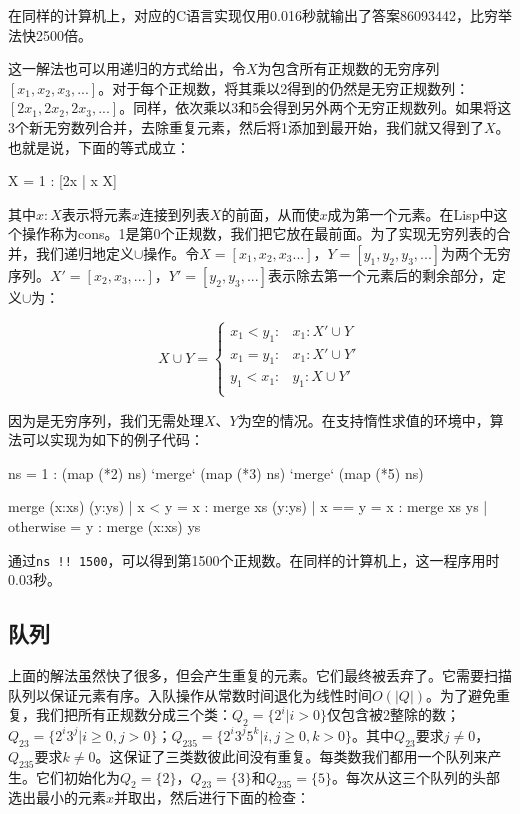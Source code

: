 \documentclass[b5paper]{ctexart}
\begin{document}
在同样的计算机上，对应的C语言实现仅用0.016秒就输出了答案86093442，比穷举法快2500倍。

这一解法也可以用递归的方式给出，令$X$为包含所有正规数的无穷序列$[x_1, x_2, x_3, ...]$。对于每个正规数，将其乘以2得到的仍然是无穷正规数列：$[2x_1, 2x_2, 2x_3, ...]$。同样，依次乘以3和5会得到另外两个无穷正规数列。如果将这3个新无穷数列合并，去除重复元素，然后将1添加到最开始，我们就又得到了$X$。也就是说，下面的等式成立：

\be
  X = 1 : [2x | \forall x \in X]\cup [3x | \forall x \in X] \cup [5x | \forall x \in X]
\ee

其中$x : X$表示将元素$x$连接到列表$X$的前面，从而使$x$成为第一个元素。在Lisp中这个操作称为cons。1是第0个正规数，我们把它放在最前面。为了实现无穷列表的合并，我们递归地定义$\cup$操作。令$X=[x_1, x_2, x_3...]$，$Y=[y_1, y_2, y_3, ...]$为两个无穷序列。$X' = [x_2, x_3, ...]$，$Y'=[y_2, y_3, ...]$表示除去第一个元素后的剩余部分，定义$\cup$为：

\[
X \cup Y = \begin{cases}
  x_1 < y_1: & x_1 : X' \cup Y \\
  x_1 = y_1: & x_1 : X' \cup Y' \\
  y_1 < x_1: & y_1 : X \cup Y' \\
\end{cases}
\]

因为是无穷序列，我们无需处理$X$、$Y$为空的情况。在支持惰性求值的环境中，算法可以实现为如下的例子代码：

\begin{Haskell}
ns = 1 : (map (*2) ns) `merge` (map (*3) ns) `merge` (map (*5) ns)

merge (x:xs) (y:ys) | x < y = x : merge xs (y:ys)
                    | x == y = x : merge xs ys
                    | otherwise = y : merge (x:xs) ys
\end{Haskell}

通过\texttt{ns !! 1500}，可以得到第1500个正规数。在同样的计算机上，这一程序用时0.03秒。

\subsection{队列}
上面的解法虽然快了很多，但会产生重复的元素。它们最终被丢弃了。它需要扫描队列以保证元素有序。入队操作从常数时间退化为线性时间$O(|Q|)$。为了避免重复，我们把所有正规数分成三个类：$Q_2 = \{2^i | i > 0\}$仅包含被2整除的数；$Q_{23} = \{ 2^i3^j | i \geq 0, j > 0 \}$；$Q_{235} = \{ 2^i3^j5^k | i,j \geq 0, k > 0\}$。其中$Q_{23}$要求$j \neq 0$，$Q_{235}$要求$k \neq 0$。这保证了三类数彼此间没有重复。每类数我们都用一个队列来产生。它们初始化为$Q_2=\{ 2 \}$，$Q_{23} = \{ 3\}$和$Q_{235} = \{ 5 \}$。每次从这三个队列的头部选出最小的元素$x$并取出，然后进行下面的检查：
\end{document}
